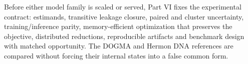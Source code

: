 Before either model family is scaled or served, Part VI fixes the experimental contract: estimands, transitive leakage closure, paired and cluster uncertainty, training/inference parity, memory-efficient optimization that preserves the objective, distributed reductions, reproducible artifacts and benchmark design with matched opportunity. The DOGMA and Hermon DNA references are compared without forcing their internal states into a false common form.
